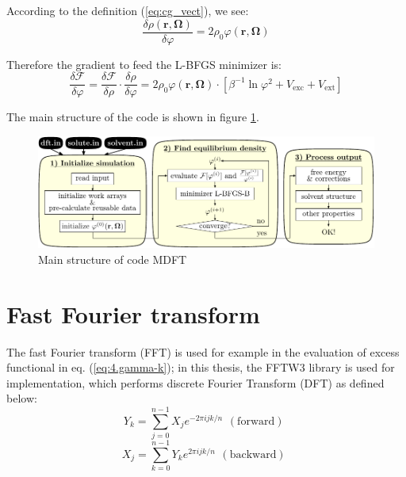 According to the definition (\ref{eq:cg_vect}), we see:
\begin{equation}
\frac{\delta\rho(\mathbf{r},\mathbf{\Omega})}{\delta\varphi}=2\rho_{0}\varphi(\mathbf{r},\mathbf{\Omega})
\end{equation}

Therefore the gradient to feed the L-BFGS minimizer is:
\begin{equation}
\frac{\delta\mathcal{F}}{\delta\varphi}=\frac{\delta\mathcal{F}}{\delta\rho}\cdot\frac{\delta\rho}{\delta\varphi}=2\rho_{0}\varphi(\mathbf{r},\mathbf{\Omega})\cdot\left[\beta^{-1}\ln\varphi^{2}+V_{\mathrm{exc}}+V_{\mathrm{ext}}\right]
\end{equation}

The main structure of the code is shown in figure \ref{fig:code-mdft}.
\begin{figure}[H]
\begin{centering}
\includegraphics[width=1\columnwidth]{_figure/mdft}
\par\end{centering}
\caption{Main structure of code MDFT\label{fig:code-mdft}}
\end{figure}


\section{Fast Fourier transform}

The fast Fourier transform (\acs{FFT}) is used for example in the
evaluation of excess functional in eq. (\ref{eq:4.gamma-k}); in this
thesis, the FFTW3 library \citep{FFTW3} is used for implementation,
which performs discrete Fourier Transform (\acs{DFT}) as defined
below:
\begin{equation}
Y_{k}=\sum_{j=0}^{n-1}X_{j}e^{-2\pi ijk/n}\begin{array}{c}
\mathrm{(forward)}\end{array}\label{eq:fftw3-fwd}
\end{equation}
\begin{equation}
X_{j}=\sum_{k=0}^{n-1}Y_{k}e^{2\pi ijk/n}\begin{array}{c}
\mathrm{(backward)}\end{array}\label{eq:fftw3-bwd}
\end{equation}

